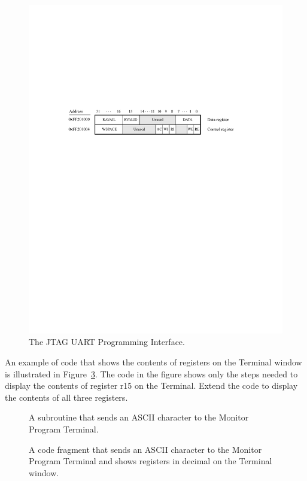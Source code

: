 \documentclass[epsfig,10pt,fullpage]{article}
\begin{document}
\begin{figure}[htb]
	\begin{center}
	\includegraphics[scale=1]{figures/figureJTAGUART.pdf}
	\end{center}
	\caption{The JTAG UART Programming Interface.}
\label{fig:UART}
\end{figure}

\noindent
An example of code that shows the contents of registers on the Terminal window
is illustrated in Figure~\ref{fig:codefrag}. The code in the figure shows only the steps needed 
to display the contents of register r15 on the Terminal. Extend the code to display the contents of 
all three registers.

\begin{figure}[H]

\caption{A subroutine that sends an ASCII character to the Monitor Program Terminal.}
\label{fig:ascii}
\end{figure}

\begin{figure}[H]
\begin{center}
\begin{minipage}[t]{16.5 cm}

\end{minipage}
\end{center}
\caption{A code fragment that sends an ASCII character to the Monitor Program Terminal and shows registers in decimal on the Terminal window.}
\label{fig:codefrag}
\end{figure}
\end{document}
